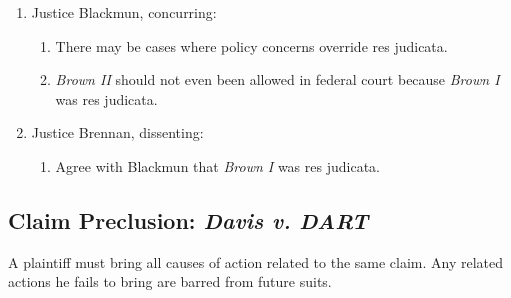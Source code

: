 \begin{enumerate}
\begin{enumerate}
        beyond any individual judge's determination of the equities in a 
        particular case.''\footnote{Casebook p. 1229.}
        \item Reversed.
    \end{enumerate}
    \item Justice Blackmun, concurring:
    \begin{enumerate}
        \item There may be cases where policy concerns override res judicata.
        \item \emph{Brown II} should not even been allowed in federal court 
        because \emph{Brown I} was res judicata.
    \end{enumerate}
    \item Justice Brennan, dissenting:
    \begin{enumerate}
        \item Agree with Blackmun that \emph{Brown I} was res judicata.
    \end{enumerate}
\end{enumerate}

\subsection{Claim Preclusion: \emph{Davis v. DART}}

A plaintiff must bring all causes of action related to the same claim. Any 
related actions he fails to bring are barred from future suits.

